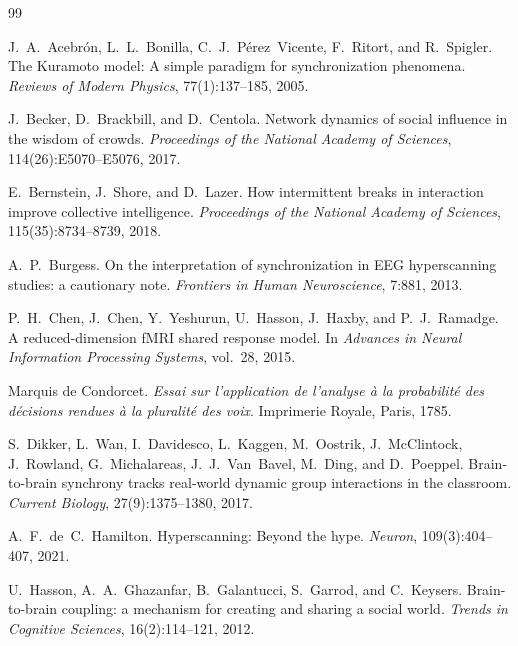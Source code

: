\documentclass[11pt]{article}
\begin{document}
\begin{thebibliography}{99}

J.~A.~Acebr{\'o}n, L.~L.~Bonilla, C.~J.~P{\'e}rez~Vicente, F.~Ritort, and R.~Spigler.
\newblock The Kuramoto model: A simple paradigm for synchronization phenomena.
\newblock \emph{Reviews of Modern Physics}, 77(1):137--185, 2005.

J.~Becker, D.~Brackbill, and D.~Centola.
\newblock Network dynamics of social influence in the wisdom of crowds.
\newblock \emph{Proceedings of the National Academy of Sciences}, 114(26):E5070--E5076, 2017.

E.~Bernstein, J.~Shore, and D.~Lazer.
\newblock How intermittent breaks in interaction improve collective intelligence.
\newblock \emph{Proceedings of the National Academy of Sciences}, 115(35):8734--8739, 2018.

A.~P.~Burgess.
\newblock On the interpretation of synchronization in EEG hyperscanning studies: a cautionary note.
\newblock \emph{Frontiers in Human Neuroscience}, 7:881, 2013.

P.~H.~Chen, J.~Chen, Y.~Yeshurun, U.~Hasson, J.~Haxby, and P.~J.~Ramadge.
\newblock A reduced-dimension fMRI shared response model.
\newblock In \emph{Advances in Neural Information Processing Systems}, vol.~28, 2015.

Marquis de Condorcet.
\newblock \emph{Essai sur l'application de l'analyse {\`a} la probabilit{\'e} des d{\'e}cisions rendues {\`a} la pluralit{\'e} des voix}.
\newblock Imprimerie Royale, Paris, 1785.

S.~Dikker, L.~Wan, I.~Davidesco, L.~Kaggen, M.~Oostrik, J.~McClintock, J.~Rowland, G.~Michalareas, J.~J.~Van~Bavel, M.~Ding, and D.~Poeppel.
\newblock Brain-to-brain synchrony tracks real-world dynamic group interactions in the classroom.
\newblock \emph{Current Biology}, 27(9):1375--1380, 2017.

A.~F.~de~C.~Hamilton.
\newblock Hyperscanning: Beyond the hype.
\newblock \emph{Neuron}, 109(3):404--407, 2021.

U.~Hasson, A.~A.~Ghazanfar, B.~Galantucci, S.~Garrod, and C.~Keysers.
\newblock Brain-to-brain coupling: a mechanism for creating and sharing a social world.
\newblock \emph{Trends in Cognitive Sciences}, 16(2):114--121, 2012.


\end{thebibliography}
\end{document}
